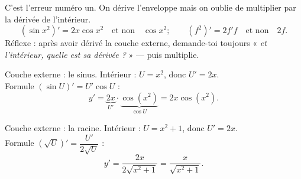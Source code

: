 \begin{piege}
C'est l'erreur numéro un. On dérive l'enveloppe mais on oublie de multiplier par la dérivée
de l'intérieur.
\[
(\sin x^2)' = 2x\cos x^2 \quad\text{et non}\quad \cos x^2 ;\qquad
(f^2)' = 2f'f \quad\text{et non}\quad 2f.
\]
Réflexe : après avoir dérivé la couche externe, demande-toi toujours
« \emph{et l'intérieur, quelle est sa dérivée ?} » — puis multiplie.
\end{piege}

\begin{exemplebox}[$y=\sin(x^2)$]
Couche externe : le sinus. Intérieur : $U=x^2$, donc $U'=2x$.\\
Formule $(\sin U)'=U'\cos U$ :
\[
y' = \underbrace{2x}_{U'}\cdot \underbrace{\cos(x^2)}_{\cos U} = 2x\cos(x^2).
\]
\end{exemplebox}

\begin{exemplebox}[$y=\sqrt{x^2+1}$]
Couche externe : la racine. Intérieur : $U=x^2+1$, donc $U'=2x$.\\
Formule $(\sqrt U)'=\dfrac{U'}{2\sqrt U}$ :
\[
y' = \frac{2x}{2\sqrt{x^2+1}} = \frac{x}{\sqrt{x^2+1}}.
\]
\end{exemplebox}

\begin{center}
\end{center}


